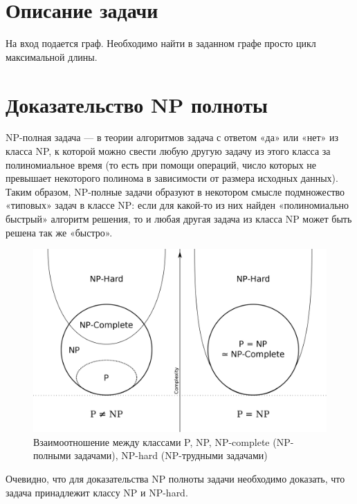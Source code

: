 \documentclass[spec, och, labwork]{../shiza}
\begin{document}
\tableofcontents

\section{Описание задачи}

На вход подается граф. Необходимо найти в заданном графе просто цикл максимальной длины.

\section{Доказательство NP полноты}

NP-полная задача — в теории алгоритмов задача с ответом «да» или «нет» из класса NP, к 
которой можно свести любую другую задачу из этого класса за полиномиальное время (то есть при 
помощи операций, число которых не превышает некоторого полинома в зависимости от размера 
исходных данных). Таким образом, NP-полные задачи образуют в некотором смысле подмножество 
«типовых» задач в классе NP: если для какой-то из них найден «полиномиально быстрый» алгоритм 
решения, то и любая другая задача из класса NP может быть решена так же «быстро».

\begin{figure}[H]
    \centering      %
    \includegraphics[width=1.\textwidth]{4}
    \caption{Взаимоотношение между классами P, NP, NP-complete (NP-полными задачами), NP-hard (NP-трудными задачами)}
    \label{fig:image1}
\end{figure}

Очевидно, что для доказательства NP полноты задачи необходимо доказать, что задача принадлежит классу NP и NP-hard.
\end{document}
